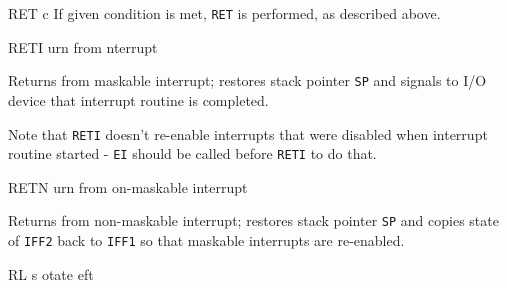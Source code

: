 \begin{basedescript}{
	\desclabelstyle{\multilinelabel}
	\desclabelwidth{3cm}}
\begin{DetailItem}{RET c}
		If given condition is met, {\tt RET} is performed, as described above.

		\begin{DetailEffects}
			\FlagsRETcc
		\end{DetailEffects}
						
		\begin{DetailTiming}
			\DetailTimeRegular[{\tt c}=false]{1}{5}
			\DetailTimeRegular[{\tt c}=true]{3}{11}
		\end{DetailTiming}

	\end{DetailItem}

	\begin{DetailItem}{RETI}
		{urn from nterrupt}
		{\SymRETI}

		Returns from maskable interrupt; restores stack pointer {\tt SP} and signals to I/O device that interrupt routine is completed.
		
		Note that {\tt RETI} doesn't re-enable interrupts that were disabled when interrupt routine started - {\tt EI} should be called before {\tt RETI} to do that.

		\begin{DetailEffects}
			\FlagsRETI
		\end{DetailEffects}
				
		\begin{DetailTiming}
			\DetailTime{4}{14}
		\end{DetailTiming}

	\end{DetailItem}

	\pagebreak
	\begin{DetailItem}{RETN}
		{urn from on-maskable interrupt}
		{\SymRETN}

		Returns from non-maskable interrupt; restores stack pointer {\tt SP} and copies state of {\tt IFF2} back to {\tt IFF1} so that maskable interrupts are re-enabled.

		\begin{DetailEffects}
			\FlagsRETN
		\end{DetailEffects}
				
		\begin{DetailTiming}
		\end{DetailTiming}

	\end{DetailItem}

	\begin{DetailItem}{RL s}
		{otate \IH{L}eft}
		{\SymRL{s}}


\end{DetailItem}
\end{basedescript}
